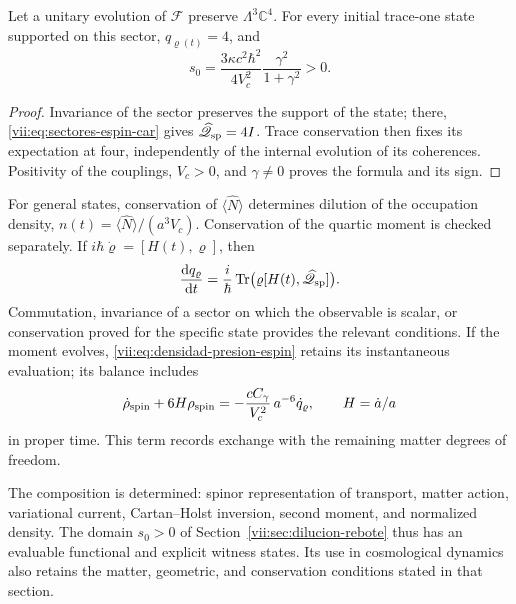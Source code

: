 \begin{corollary}
\label{vii:cor:dominio-positivo-conservado}
Let a unitary evolution of \(\mathcal F\) preserve
\(\Lambda^3\mathbb C^4\). For every initial trace-one state
supported on this sector, \(q_{\varrho(t)}=4\), and
\begin{equation}
 s_0=\frac{3\kappa c^2\hbar^2}{4V_c^2}
                   \frac{\gamma^2}{1+\gamma^2}>0.
 \label{vii:eq:amplitud-positiva-sector-tres}
\end{equation}
\end{corollary}
\begin{proof}
Invariance of the sector preserves the support of the state; there,
\eqref{vii:eq:sectores-espin-car} gives
\(\widehat{\mathscr Q}_{\rm sp}=4I\). Trace conservation then
fixes its expectation at four, independently of the internal
evolution of its coherences. Positivity of the couplings,
\(V_c>0\), and \(\gamma\ne0\) proves the formula and its sign.
\end{proof}

For general states, conservation of
\(\langle\widehat N\rangle\) determines dilution of the occupation
density, \(n(t)=\langle\widehat N\rangle/(a^3V_c)\).
Conservation of the quartic moment is checked separately.
If \(i\hbar\dot\varrho=[H(t),\varrho]\), then
\begin{equation}
 \frac{\mathrm d q_\varrho}{\mathrm dt}
 =\frac{i}{\hbar}\operatorname{Tr}
       \bigl(\varrho[H(t),\widehat{\mathscr Q}_{\rm sp}]\bigr).
 \label{vii:eq:conservacion-momento-cuartico}
\end{equation}
Commutation, invariance of a sector on which the observable is scalar,
or conservation proved for the specific state provides the relevant
conditions. If the moment evolves,
\eqref{vii:eq:densidad-presion-espin} retains its instantaneous
evaluation; its balance includes
\[
 \dot\rho_{\rm spin}+6H\rho_{\rm spin}
 =-\frac{cC_\gamma}{V_c^2}\,a^{-6}\dot q_\varrho,
 \qquad H=\dot a/a
\]
in proper time. This term records exchange with the remaining matter
degrees of freedom.

The composition is determined: spinor representation of transport,
matter action, variational current, Cartan--Holst inversion, second
moment, and normalized density. The domain
\(s_0>0\) of Section~\ref{vii:sec:dilucion-rebote} thus has an
evaluable functional and explicit witness states. Its use in
cosmological dynamics also retains the matter, geometric, and
conservation conditions stated in that section.

